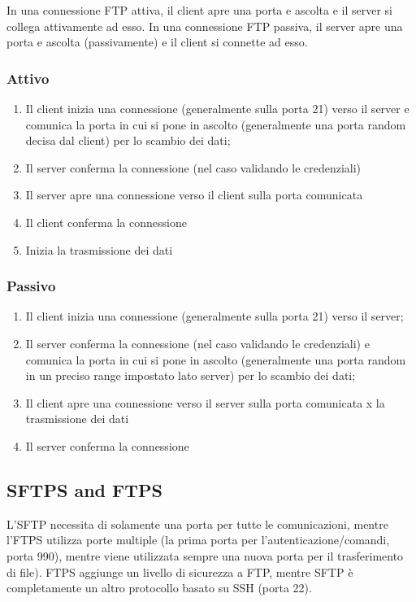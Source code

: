 \documentclass[a4paper]{article}
\begin{document}
In una connessione FTP attiva, il client apre una porta e ascolta
e il server si collega attivamente ad esso.
In una connessione FTP passiva, il server apre una porta e ascolta
(passivamente) e il client si connette ad esso. 

\subsubsection{Attivo}

\begin{enumerate}
    \item Il client inizia una connessione (generalmente sulla porta 21) verso il server e comunica la porta in cui si pone in ascolto (generalmente una porta random decisa dal client) per lo scambio dei dati;
    \item Il server conferma la connessione (nel caso validando le credenziali)
    \item Il server apre una connessione verso il client sulla porta comunicata
    \item Il client conferma la connessione
    \item Inizia la trasmissione dei dati
\end{enumerate}

\subsubsection{Passivo}

\begin{enumerate}
    \item Il client inizia una connessione (generalmente sulla porta 21) verso il server;
    \item Il server conferma la connessione (nel caso validando le credenziali) e comunica la porta in cui si pone in ascolto (generalmente una porta random in un preciso range impostato lato server) per lo scambio dei dati;
    \item Il client apre una connessione verso il server sulla porta comunicata x la trasmissione dei dati
    \item Il server conferma la connessione
\end{enumerate}

\subsection{SFTPS and FTPS}

L'SFTP necessita di solamente una porta per tutte le comunicazioni, mentre l'FTPS utilizza porte multiple (la prima porta per l'autenticazione/comandi, porta 990), mentre viene utilizzata sempre una nuova porta per il trasferimento di file).
FTPS aggiunge un livello di sicurezza a FTP, mentre SFTP è completamente un altro protocollo basato su SSH (porta 22).
\end{document}
